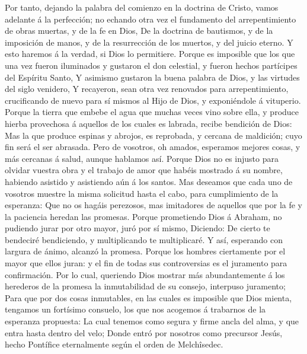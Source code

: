  Por tanto, dejando la palabra del comienzo en la doctrina
de Cristo, vamos adelante á la perfección; no echando otra vez el
fundamento del arrepentimiento de obras muertas, y de la fe en Dios,
 De la doctrina de bautismos, y de la imposición de manos, y
de la resurrección de los muertos, y del juicio eterno.  Y
esto haremos á la verdad, si Dios lo permitiere.  Porque es
imposible que los que una vez fueron iluminados y gustaron el don
celestial, y fueron hechos partícipes del Espíritu Santo,  Y
asimismo gustaron la buena palabra de Dios, y las virtudes del siglo
venidero,  Y recayeron, sean otra vez renovados para
arrepentimiento, crucificando de nuevo para sí mismos al Hijo de Dios, y
exponiéndole á vituperio.  Porque la tierra que embebe el
agua que muchas veces vino sobre ella, y produce hierba provechosa á
aquellos de los cuales es labrada, recibe bendición de Dios:
 Mas la que produce espinas y abrojos, es reprobada, y
cercana de maldición; cuyo fin será el ser abrasada.  Pero
de vosotros, oh amados, esperamos mejores cosas, y más cercanas á salud,
aunque hablamos así.  Porque Dios no es injusto para
olvidar vuestra obra y el trabajo de amor que habéis mostrado á su
nombre, habiendo asistido y asistiendo aún á los santos. 
Mas deseamos que cada uno de vosotros muestre la misma solicitud hasta
el cabo, para cumplimiento de la esperanza:  Que no os
hagáis perezosos, mas imitadores de aquellos que por la fe y la
paciencia heredan las promesas.  Porque prometiendo Dios á
Abraham, no pudiendo jurar por otro mayor, juró por sí mismo,
 Diciendo: De cierto te bendeciré bendiciendo, y
multiplicando te multiplicaré.  Y así, esperando con
largura de ánimo, alcanzó la promesa.  Porque los hombres
ciertamente por el mayor que ellos juran: y el fin de todas sus
controversias es el juramento para confirmación.  Por lo
cual, queriendo Dios mostrar más abundantemente á los herederos de la
promesa la inmutabilidad de su consejo, interpuso juramento;
 Para que por dos cosas inmutables, en las cuales es
imposible que Dios mienta, tengamos un fortísimo consuelo, los que nos
acogemos á trabarnos de la esperanza propuesta:  La cual
tenemos como segura y firme ancla del alma, y que entra hasta dentro del
velo;  Donde entró por nosotros como precursor Jesús, hecho
Pontífice eternalmente según el orden de Melchîsedec.


